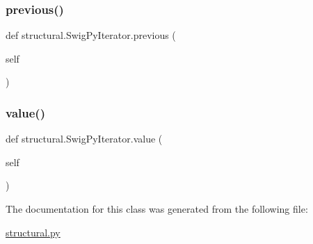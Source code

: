 \mbox{\label{classstructural_1_1_swig_py_iterator_a6416e521ed806d4ca6d49fea9ca9ae2b}} 
\subsubsection{\texorpdfstring{previous()}{previous()}}
{\footnotesize\ttfamily def structural.\+Swig\+Py\+Iterator.\+previous (\begin{DoxyParamCaption}\item[{}]{self }\end{DoxyParamCaption})}

\mbox{\label{classstructural_1_1_swig_py_iterator_aa0a1ad60e19c436e3b82a71d31050132}} 
\subsubsection{\texorpdfstring{value()}{value()}}
{\footnotesize\ttfamily def structural.\+Swig\+Py\+Iterator.\+value (\begin{DoxyParamCaption}\item[{}]{self }\end{DoxyParamCaption})}



The documentation for this class was generated from the following file\+:\begin{DoxyCompactItemize}
\item 
\hyperlink{structural_8py}{structural.\+py}\end{DoxyCompactItemize}
